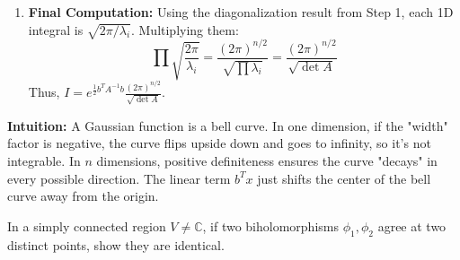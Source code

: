 \begin{solution}
\begin{enumerate}
    \item \textbf{Final Computation:} Using the diagonalization result from Step 1, each 1D integral is $\sqrt{2\pi/\lambda_i}$. Multiplying them:
    \[ \prod \sqrt{\frac{2\pi}{\lambda_i}} = \frac{(2\pi)^{n/2}}{\sqrt{\prod \lambda_i}} = \frac{(2\pi)^{n/2}}{\sqrt{\det A}} \]
    Thus, $I = e^{\frac{1}{2}b^T A^{-1}b} \frac{(2\pi)^{n/2}}{\sqrt{\det A}}$.
\end{enumerate}

\bigskip

\textbf{Intuition:} 
A Gaussian function is a bell curve. In one dimension, if the "width" factor is negative, the curve flips upside down and goes to infinity, so it's not integrable. In $n$ dimensions, positive definiteness ensures the curve "decays" in every possible direction. The linear term $b^T x$ just shifts the center of the bell curve away from the origin.
\end{solution}

\begin{exercise}
\label{analysis:2012:8}
In a simply connected region $V \neq \mathbb{C}$, if two biholomorphisms $\phi_1, \phi_2$ agree at two distinct points, show they are identical.
\end{exercise}

